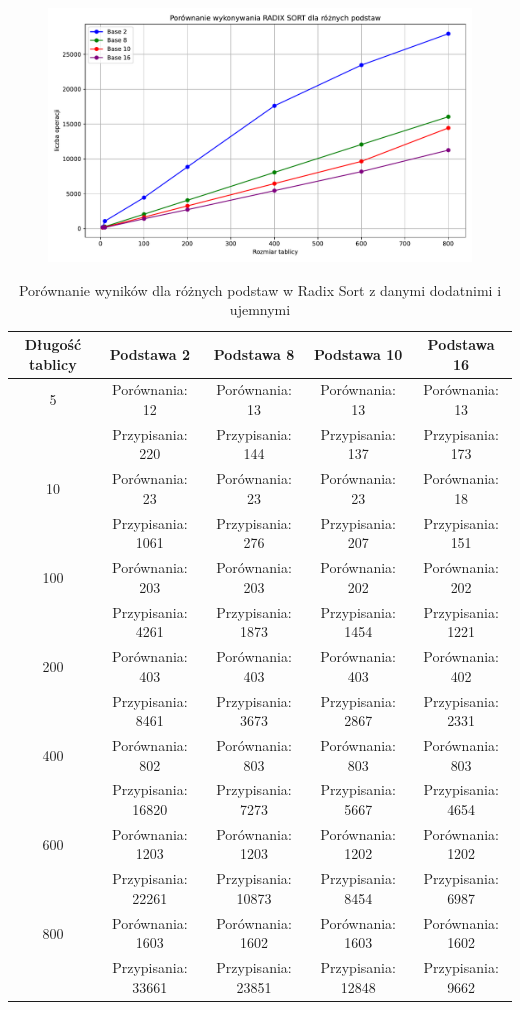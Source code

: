 \documentclass{article}
\begin{document}
\begin{figure}[H]
	\centering
	\includegraphics[width=1\textwidth]{wykres2.pdf}
\end{figure}


	\begin{table}[H]
	\centering
	\begin{tabular}{|c|c|c|c|c|}
		\hline
		\textbf{Długość tablicy} & \textbf{Podstawa 2} & \textbf{Podstawa 8} & \textbf{Podstawa 10} & \textbf{Podstawa 16} \\
		\hline
		5   & Porównania: 12  & Porównania: 13  & Porównania: 13  & Porównania: 13  \\
		& Przypisania: 220 & Przypisania: 144 & Przypisania: 137 & Przypisania: 173 \\
		\hline
		10  & Porównania: 23  & Porównania: 23  & Porównania: 23  & Porównania: 18  \\
		& Przypisania: 1061 & Przypisania: 276 & Przypisania: 207 & Przypisania: 151 \\
		\hline
		100 & Porównania: 203 & Porównania: 203 & Porównania: 202 & Porównania: 202 \\
		& Przypisania: 4261 & Przypisania: 1873 & Przypisania: 1454 & Przypisania: 1221 \\
		\hline
		200 & Porównania: 403 & Porównania: 403 & Porównania: 403 & Porównania: 402 \\
		& Przypisania: 8461 & Przypisania: 3673 & Przypisania: 2867 & Przypisania: 2331 \\
		\hline
		400 & Porównania: 802 & Porównania: 803 & Porównania: 803 & Porównania: 803 \\
		& Przypisania: 16820 & Przypisania: 7273 & Przypisania: 5667 & Przypisania: 4654 \\
		\hline
		600 & Porównania: 1203 & Porównania: 1203 & Porównania: 1202 & Porównania: 1202 \\
		& Przypisania: 22261 & Przypisania: 10873 & Przypisania: 8454 & Przypisania: 6987 \\
		\hline
		800 & Porównania: 1603 & Porównania: 1602 & Porównania: 1603 & Porównania: 1602 \\
		& Przypisania: 33661 & Przypisania: 23851 & Przypisania: 12848 & Przypisania: 9662 \\
		\hline
	\end{tabular}
	\caption{Porównanie wyników dla różnych podstaw w Radix Sort z danymi dodatnimi i ujemnymi}
	
\end{table}
\end{document}
